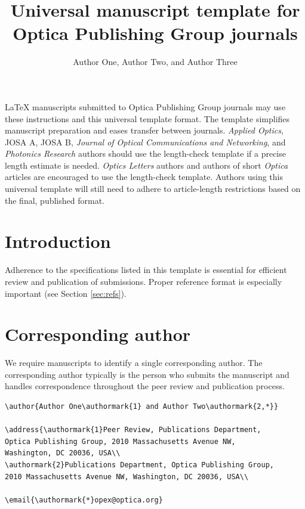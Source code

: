 \documentclass{../packages/optica-article}
\begin{document}
\title{Universal manuscript template for Optica Publishing Group journals}

\author{Author One, Author Two, and Author Three}

\address{Universidad Complutense de Madrid, Madrid, DC 28040, España}



\begin{abstract*}
	\LaTeX{} manuscripts submitted to Optica Publishing Group journals may use these instructions and this universal template format. The template simplifies manuscript preparation and eases transfer between journals. \emph{Applied Optics}, JOSA A, JOSA B, \emph{Journal of Optical Communications and Networking}, and \emph{Photonics Research} authors should use the length-check template if a precise length estimate is needed. \emph{Optics Letters} authors and authors of short \emph{Optica} articles are encouraged to use the length-check template. Authors using this universal template will still need to adhere to article-length restrictions based on the final, published format.
\end{abstract*}

\section{Introduction}
Adherence to the specifications listed in this template is essential for efficient review and publication of submissions. Proper reference format is especially important (see Section \ref{sec:refs}).

\section{Corresponding author}

We require manuscripts to identify a single corresponding author. The corresponding author typically is the person who submits the manuscript and handles correspondence throughout the peer review and publication process.

\begin{verbatim}
\author{Author One\authormark{1} and Author Two\authormark{2,*}}

\address{\authormark{1}Peer Review, Publications Department,
Optica Publishing Group, 2010 Massachusetts Avenue NW,
Washington, DC 20036, USA\\
\authormark{2}Publications Department, Optica Publishing Group,
2010 Massachusetts Avenue NW, Washington, DC 20036, USA\\

\email{\authormark{*}opex@optica.org}
\end{verbatim}
\end{document}
